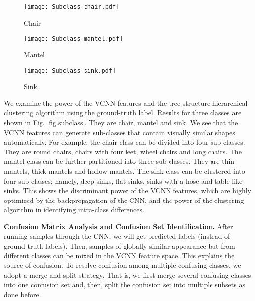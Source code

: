 \documentclass[preprint,12pt]{elsarticle}
\begin{document}
\begin{figure*}[t]
\centering
\begin{subfigure}[b] {0.4\textwidth}
\centering
\texttt{[image: Subclass\_chair.pdf]}
\caption{Chair}
\end{subfigure}
\centering
\begin{subfigure}[b] {0.4\textwidth}
\centering
\texttt{[image: Subclass\_mantel.pdf]}
\caption{Mantel}
\end{subfigure}
\centering
\begin{subfigure}[b] {0.4\textwidth}
\centering
\texttt{[image: Subclass\_sink.pdf]}
\caption{Sink}
\end{subfigure}
\caption{Illustration of 3D shapes in sub-classes obtained from (a) the
Chair class, (b) the Mantel class and (c) the Sink class. We provide 16
representative shapes for each sub-class and encircle them with a blue
box.}\label{fig.subclass}
\end{figure*}

We examine the power of the VCNN features and the tree-structure
hierarchical clustering algorithm using the ground-truth label.  Results
for three classes are shown in Fig. \ref{fig.subclass}. They are chair,
mantel and sink. We see that the VCNN features can generate sub-classes
that contain visually similar shapes automatically. For example, the
chair class can be divided into four sub-classes.  They are round
chairs, chairs with four feet, wheel chairs and long chairs.  The mantel
class can be further partitioned into three sub-classes. They are thin
mantels, thick mantels and hollow mantels. The sink class can be
clustered into four sub-classes; namely, deep sinks, flat sinks, sinks
with a hose and table-like sinks.  This shows the discriminant power of
the VCNN features, which are highly optimized by the backpropagation of
the CNN, and the power of the clustering algorithm in identifying
intra-class differences. 

{\bf Confusion Matrix Analysis and Confusion Set Identification.} After
running samples through the CNN, we will get predicted labels (instead
of ground-truth labels). Then, samples of globally similar appearance
but from different classes can be mixed in the VCNN feature space. This
explains the source of confusion. To resolve confusion among multiple
confusing classes, we adopt a merge-and-split strategy. That is, we
first merge several confusing classes into one confusion set and, then,
split the confusion set into multiple subsets as done before. 
\end{document}
